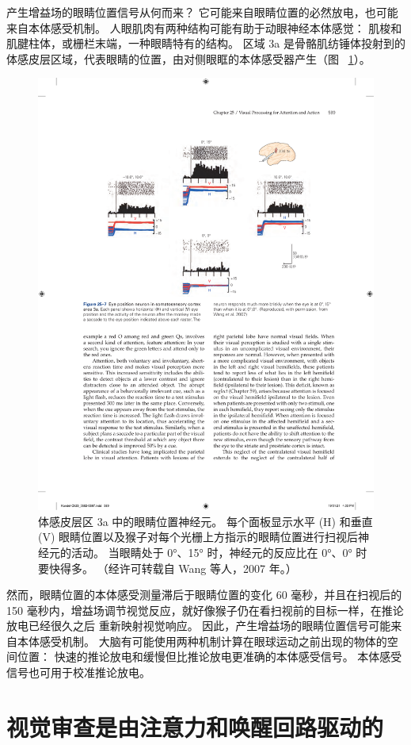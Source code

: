 产生增益场的眼睛位置信号从何而来？
它可能来自眼睛位置的必然放电，也可能来自本体感受机制。
人眼肌肉有两种结构可能有助于动眼神经本体感觉：
肌梭和肌腱柱体，或栅栏末端，一种眼睛特有的结构。
区域 3a 是骨骼肌纺锤体投射到的体感皮层区域，代表眼睛的位置，由对侧眼眶的本体感受器产生（图 ~\ref{fig:25_7}）。


\begin{figure}[htbp]
	\centering
	\includegraphics[width=0.8\linewidth]{chap25/fig_25_7}
	\caption{体感皮层区 3a 中的眼睛位置神经元。 每个面板显示水平 (H) 和垂直 (V) 眼睛位置以及猴子对每个光栅上方指示的眼睛位置进行扫视后神经元的活动。 当眼睛处于 0°、15° 时，神经元的反应比在 0°、0° 时要快得多。 （经许可转载自 Wang 等人，2007 年。）}
	\label{fig:25_7}
\end{figure}


然而，眼睛位置的本体感受测量滞后于眼睛位置的变化 60 毫秒，并且在扫视后的 150 毫秒内，增益场调节视觉反应，就好像猴子仍在看扫视前的目标一样，在推论放电已经很久之后 重新映射视觉响应。
因此，产生增益场的眼睛位置信号可能来自本体感受机制。
大脑有可能使用两种机制计算在眼球运动之前出现的物体的空间位置：
快速的推论放电和缓慢但比推论放电更准确的本体感受信号。
本体感受信号也可用于校准推论放电。



\section{视觉审查是由注意力和唤醒回路驱动的}

